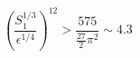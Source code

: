 \begin{equation}
\left( \frac{S_1^{1/3}}{\epsilon^{1/4}} 
\right)^{12} > \frac{575}{\frac{27}{2} \pi^2} \sim 4.3
\label{inequality}
\end{equation}

